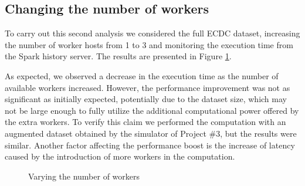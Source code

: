 \documentclass[11pt]{article}
\begin{document}
\subsection{Changing the number of workers}
To carry out this second analysis we considered the full ECDC dataset, increasing the number of worker hosts from 1 to 3 and monitoring the execution time from the Spark history server. The results are presented in Figure \ref{fig:workers}. 

As expected, we observed a decrease in the execution time as the number of available workers increased. However, the performance improvement was not as significant as initially expected, potentially due to the dataset size, which may not be large enough to fully utilize the additional computational power offered by the extra workers. To verify this claim we performed the computation with an augmented dataset obtained by the simulator of Project \#3, but the results were similar. Another factor affecting the performance boost is the increase of latency caused by the introduction of more workers in the computation.

\begin{figure}[h]
    \centering
    \caption{Varying the number of workers}
    \label{fig:workers}
\end{figure}
\end{document}
